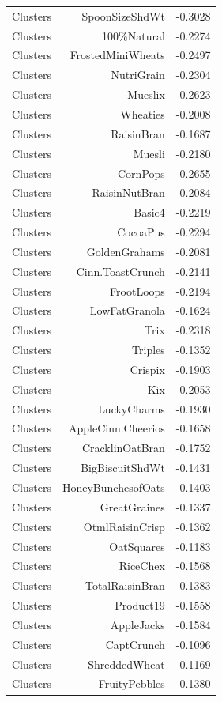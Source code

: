 \begin{longtable}{@{}lrr@{}}
Clusters & SpoonSizeShdWt & -0.3028 \\
Clusters & 100\%Natural & -0.2274 \\
Clusters & FrostedMiniWheats & -0.2497 \\
Clusters & NutriGrain & -0.2304 \\
Clusters & Mueslix & -0.2623 \\
Clusters & Wheaties & -0.2008 \\
Clusters & RaisinBran & -0.1687 \\
Clusters & Muesli & -0.2180 \\
Clusters & CornPops & -0.2655 \\
Clusters & RaisinNutBran & -0.2084 \\
Clusters & Basic4 & -0.2219 \\
Clusters & CocoaPus & -0.2294 \\
Clusters & GoldenGrahams & -0.2081 \\
Clusters & Cinn.ToastCrunch & -0.2141 \\
Clusters & FrootLoops & -0.2194 \\
Clusters & LowFatGranola & -0.1624 \\
Clusters & Trix & -0.2318 \\
Clusters & Triples & -0.1352 \\
Clusters & Crispix & -0.1903 \\
Clusters & Kix & -0.2053 \\
Clusters & LuckyCharms & -0.1930 \\
Clusters & AppleCinn.Cheerios & -0.1658 \\
Clusters & CracklinOatBran & -0.1752 \\
Clusters & BigBiscuitShdWt & -0.1431 \\
Clusters & HoneyBunchesofOats & -0.1403 \\
Clusters & GreatGraines & -0.1337 \\
Clusters & OtmlRaisinCrisp & -0.1362 \\
Clusters & OatSquares & -0.1183 \\
Clusters & RiceChex & -0.1568 \\
Clusters & TotalRaisinBran & -0.1383 \\
Clusters & Product19 & -0.1558 \\
Clusters & AppleJacks & -0.1584 \\
Clusters & CaptCrunch & -0.1096 \\
Clusters & ShreddedWheat & -0.1169 \\
Clusters & FruityPebbles & -0.1380 \\

\end{longtable}
